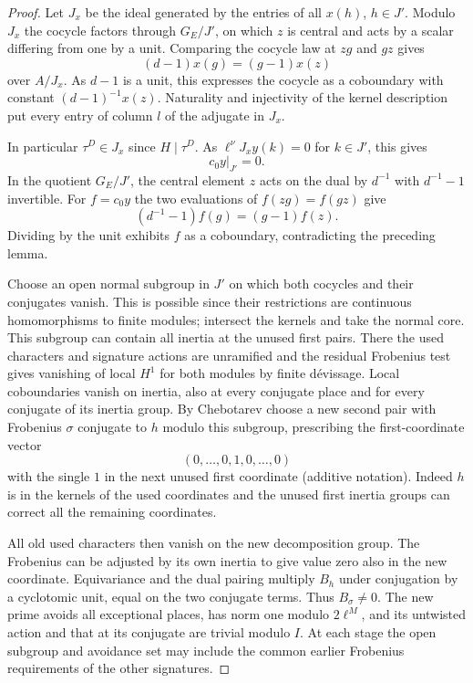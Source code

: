\begin{proof}
Let \(J_x\) be the ideal generated by the entries of all
\(x(h)\), \(h\in J'\). Modulo \(J_x\) the cocycle factors
through \(G_E/J'\), on which \(z\) is central and acts by
a scalar differing from one by a unit. Comparing the cocycle law at \(zg\) and \(gz\) gives
\[
        (d-1)x(g)=(g-1)x(z)
\]
over \(A/J_x\). As \(d-1\) is a unit, this expresses the
cocycle as a coboundary with constant \((d-1)^{-1}x(z)\). Naturality and injectivity
of the kernel description put every entry of column \(l\)
of the adjugate in \(J_x\).

In particular \(\tau^D\in J_x\)
since \(H\mid\tau^D\). As \(\ell^\nu J_x y(k)=0\) for \(k\in J'\),
this gives
\[
 c_0y|_{J'}=0.
\]
In the quotient
\(G_E/J'\), the central element \(z\) acts on the dual by \(d^{-1}\)
with \(d^{-1}-1\) invertible. For \(f=c_0y\) the two evaluations of \(f(zg)=f(gz)\) give
\[
 (d^{-1}-1)f(g)=(g-1)f(z).
\]
Dividing by the unit exhibits \(f\) as a coboundary, contradicting the preceding lemma.

Choose an open normal subgroup in \(J'\) on which both
cocycles and their conjugates vanish. This is possible since
their restrictions are continuous homomorphisms to finite
modules; intersect the kernels and take the normal core.
This subgroup can contain all inertia at the unused first
pairs. There the used characters and signature actions are
unramified and the residual Frobenius test gives vanishing
of local \(H^1\) for both modules by finite dévissage.
Local coboundaries vanish on inertia, also at every conjugate
place and for every conjugate of its inertia group.
By Chebotarev choose a new second pair with Frobenius
\(\sigma\) conjugate to \(h\) modulo this subgroup, prescribing the first-coordinate vector
\[
 (0,\ldots,0,1,0,\ldots,0)
\]
with the single \(1\) in the next unused first coordinate (additive notation). Indeed \(h\) is in
the kernels of the used coordinates and the unused first
inertia groups can correct all the remaining coordinates.

All old used characters then vanish on the new decomposition
group. The Frobenius can be adjusted by its own inertia to
give value zero also in the new coordinate. Equivariance and
the dual pairing multiply \(B_h\) under conjugation by a
cyclotomic unit, equal on the two conjugate terms. Thus
\(B_\sigma\ne0\). The new prime avoids all exceptional
places, has norm one modulo \(2\ell^M\), and its untwisted
action and that at its conjugate are trivial modulo \(I\).
At each stage the open subgroup and avoidance set may include
the common earlier Frobenius requirements of the other signatures.

\end{proof}
